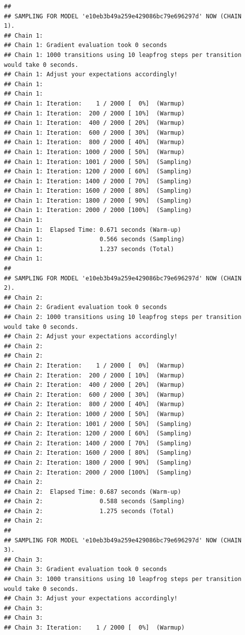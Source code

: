 \documentclass[]{article}
\begin{document}
\begin{verbatim}
## 
## SAMPLING FOR MODEL 'e10eb3b49a259e429086bc79e696297d' NOW (CHAIN 1).
## Chain 1: 
## Chain 1: Gradient evaluation took 0 seconds
## Chain 1: 1000 transitions using 10 leapfrog steps per transition would take 0 seconds.
## Chain 1: Adjust your expectations accordingly!
## Chain 1: 
## Chain 1: 
## Chain 1: Iteration:    1 / 2000 [  0%]  (Warmup)
## Chain 1: Iteration:  200 / 2000 [ 10%]  (Warmup)
## Chain 1: Iteration:  400 / 2000 [ 20%]  (Warmup)
## Chain 1: Iteration:  600 / 2000 [ 30%]  (Warmup)
## Chain 1: Iteration:  800 / 2000 [ 40%]  (Warmup)
## Chain 1: Iteration: 1000 / 2000 [ 50%]  (Warmup)
## Chain 1: Iteration: 1001 / 2000 [ 50%]  (Sampling)
## Chain 1: Iteration: 1200 / 2000 [ 60%]  (Sampling)
## Chain 1: Iteration: 1400 / 2000 [ 70%]  (Sampling)
## Chain 1: Iteration: 1600 / 2000 [ 80%]  (Sampling)
## Chain 1: Iteration: 1800 / 2000 [ 90%]  (Sampling)
## Chain 1: Iteration: 2000 / 2000 [100%]  (Sampling)
## Chain 1: 
## Chain 1:  Elapsed Time: 0.671 seconds (Warm-up)
## Chain 1:                0.566 seconds (Sampling)
## Chain 1:                1.237 seconds (Total)
## Chain 1: 
## 
## SAMPLING FOR MODEL 'e10eb3b49a259e429086bc79e696297d' NOW (CHAIN 2).
## Chain 2: 
## Chain 2: Gradient evaluation took 0 seconds
## Chain 2: 1000 transitions using 10 leapfrog steps per transition would take 0 seconds.
## Chain 2: Adjust your expectations accordingly!
## Chain 2: 
## Chain 2: 
## Chain 2: Iteration:    1 / 2000 [  0%]  (Warmup)
## Chain 2: Iteration:  200 / 2000 [ 10%]  (Warmup)
## Chain 2: Iteration:  400 / 2000 [ 20%]  (Warmup)
## Chain 2: Iteration:  600 / 2000 [ 30%]  (Warmup)
## Chain 2: Iteration:  800 / 2000 [ 40%]  (Warmup)
## Chain 2: Iteration: 1000 / 2000 [ 50%]  (Warmup)
## Chain 2: Iteration: 1001 / 2000 [ 50%]  (Sampling)
## Chain 2: Iteration: 1200 / 2000 [ 60%]  (Sampling)
## Chain 2: Iteration: 1400 / 2000 [ 70%]  (Sampling)
## Chain 2: Iteration: 1600 / 2000 [ 80%]  (Sampling)
## Chain 2: Iteration: 1800 / 2000 [ 90%]  (Sampling)
## Chain 2: Iteration: 2000 / 2000 [100%]  (Sampling)
## Chain 2: 
## Chain 2:  Elapsed Time: 0.687 seconds (Warm-up)
## Chain 2:                0.588 seconds (Sampling)
## Chain 2:                1.275 seconds (Total)
## Chain 2: 
## 
## SAMPLING FOR MODEL 'e10eb3b49a259e429086bc79e696297d' NOW (CHAIN 3).
## Chain 3: 
## Chain 3: Gradient evaluation took 0 seconds
## Chain 3: 1000 transitions using 10 leapfrog steps per transition would take 0 seconds.
## Chain 3: Adjust your expectations accordingly!
## Chain 3: 
## Chain 3: 
## Chain 3: Iteration:    1 / 2000 [  0%]  (Warmup)

\end{verbatim}
\end{document}
